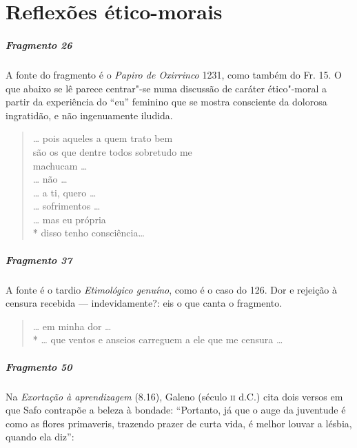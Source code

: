 \chapter{Reflexões ético-morais}


\paragraph{Fragmento 26}

{\small A fonte do fragmento é o \textit{Papiro de Oxirrinco} 1231, como também do Fr.
15. O que abaixo se lê parece centrar"-se numa discussão de caráter ético"-moral
a partir da experiência do “eu” feminino que se mostra consciente da dolorosa
ingratidão, e não ingenuamente iludida.}

\begin{verse}
\ldots{} pois aqueles a quem trato bem\\
são os que dentre todos sobretudo me\\
machucam \ldots{}\\
\ldots{} não \ldots{}\\
\ldots{} a ti, quero \ldots{}\\
\ldots{} sofrimentos \ldots{}\\
\ldots{} mas eu própria\\*
disso tenho consciência\ldots{}
\end{verse}

\paragraph{Fragmento 37}

{\small A fonte é o tardio \textit{Etimológico genuíno}, como é o caso do 126. Dor e
rejeição à censura recebida --- indevidamente?: eis o que canta o fragmento.}

\begin{verse}
\ldots{} em minha dor \ldots{}\\*
\ldots{} que ventos e anseios carreguem a ele que \qb{}me censura \ldots{}
\end{verse}

\paragraph{Fragmento 50}

{\small Na \textit{Exortação à aprendizagem} (8.16), Galeno (século \textsc{ii} d.C.) cita dois versos
em que Safo contrapõe a beleza à bondade: ``Portanto, já que o auge da
juventude é como as flores primaveris, trazendo prazer de curta vida, é melhor
louvar a lésbia, quando ela diz'':}

